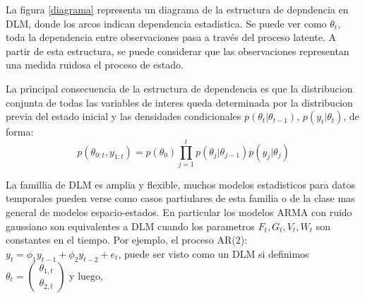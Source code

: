 \documentclass[12pt]{article}\usepackage[]{graphicx}\usepackage[]{color}
\begin{document}
\begin{center}
\label{diagrama}
\end{center}

La figura \ref{diagrama} representa un diagrama de la estructura de depndencia en DLM, donde los arcos indican dependencia estadistica. Se puede ver como  $\theta_t$, toda la dependencia entre observaciones pasa a través del proceso latente. A partir de esta estructura, se puede considerar que las observaciones representan una medida ruidosa el proceso de estado.

La principal consecuencia de la estructura de dependencia es que la distribucion conjunta de todas las variables de interes queda determinada por la distribucion previa del estado inicial y las densidades condicionales $p(\theta_t | \theta_{t-1})$, $p(y_t|\theta_t)$, de forma: 
\[
p(\theta_{0:t}, y_{1:t}) =  p(\theta_0) \prod_{j=1}^t  p(\theta_j | \theta_{j-1})  p(y_j|\theta_j)
\]

La famillia de DLM es amplia y flexible, muchos modelos estadisticos para datos temporales pueden verse como casos partiulares de esta familia o de la clase mas general de modelos espacio-estados. En particular los modelos ARMA con ruido gaussiano son equivalentes a DLM cuando los parametros $F_t, G_t, V_t, W_t$ son constantes en el tiempo. Por ejemplo, el proceso  AR(2): $y_t = \phi_1 y_{t-1} + \phi_2 y_{t-2} + e_t$, puede ser visto como un DLM si definimos $\theta_t = 
\begin{pmatrix}
\theta_{1,t} \\
\theta_{2,t}
\end{pmatrix}
$
y luego, 
\end{document}

